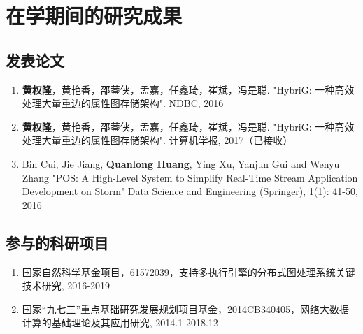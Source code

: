 
\chapter{在学期间的研究成果}

\section*{发表论文}
\begin{enumerate}
    \item \textbf{黄权隆}，黄艳香，邵蓥侠，孟嘉，任鑫琦，崔斌，冯是聪. "HybriG: 一种高效处理大量重边的属性图存储架构". NDBC, 2016
    \item \textbf{黄权隆}，黄艳香，邵蓥侠，孟嘉，任鑫琦，崔斌，冯是聪. "HybriG: 一种高效处理大量重边的属性图存储架构". 计算机学报, 2017（已接收）
    \item Bin Cui, Jie Jiang, \textbf{Quanlong Huang}, Ying Xu, Yanjun Gui and Wenyu Zhang
"POS: A High-Level System to Simplify Real-Time Stream Application Development on Storm"
Data Science and Engineering (Springer),  1(1): 41-50, 2016
\end{enumerate}

\section*{参与的科研项目}

\begin{enumerate}
  \item 国家自然科学基金项目，61572039，支持多执行引擎的分布式图处理系统关键技术研究, 2016-2019
  \item 国家“九七三”重点基础研究发展规划项目基金，2014CB340405，网络大数据计算的基础理论及其应用研究, 2014.1-2018.12
\end{enumerate}

